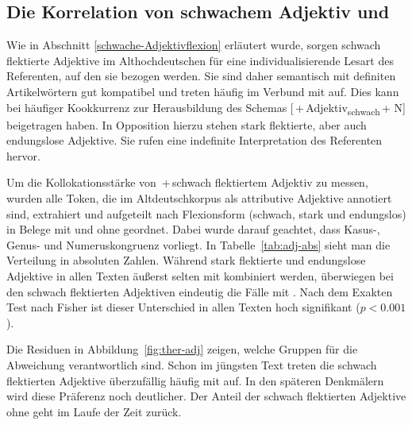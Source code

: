 \subsection{Die Korrelation von schwachem Adjektiv und } \label{sec:ergeb-adjflex}

Wie in Abschnitt \ref{schwache-Adjektivflexion} erläutert wurde, sorgen schwach flektierte Adjektive im Althochdeutschen für eine individualisierende Lesart des Referenten, auf den sie bezogen werden. Sie sind daher semantisch mit definiten Artikelwörtern gut kompatibel und treten häufig im Verbund mit  auf. Dies kann bei häufiger Kookkurrenz zur Herausbildung des Schemas [\,+\,Adjektiv\textsubscript{schwach}\,+ N] beigetragen haben. In Opposition hierzu stehen stark flektierte, aber auch endungslose Adjektive. Sie rufen eine indefinite Interpretation des Referenten hervor. 

Um die Kollokationsstärke von \,+\,schwach flektiertem Adjektiv zu messen, wurden alle Token, die im Altdeutschkorpus als attributive Adjektive annotiert sind, extrahiert und aufgeteilt nach Flexionsform (schwach, stark und endungslos) in Belege mit und ohne  geordnet. Dabei wurde darauf geachtet, dass Kasus-, Genus- und Numeruskongruenz vorliegt. In  Tabelle~\ref{tab:adj-abs} sieht man die Verteilung in absoluten Zahlen. Während stark flektierte und endungslose Adjektive in allen Texten äußerst selten mit  kombiniert werden, überwiegen bei den schwach flektierten Adjektiven eindeutig die Fälle mit . Nach dem Exakten Test nach Fisher ist dieser Unterschied in allen Texten hoch signifikant ($p < 0.001$). 

Die Residuen in Abbildung~\ref{fig:ther-adj} zeigen, welche Gruppen für die Abweichung verantwortlich sind. Schon im jüngsten Text treten die schwach flektierten Adjektive überzufällig häufig mit  auf. In den späteren Denkmälern wird diese Präferenz noch deutlicher. Der Anteil der schwach flektierten Adjektive ohne  geht im Laufe der Zeit zurück. 


